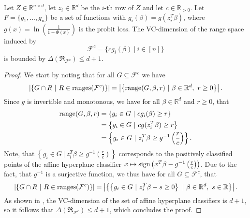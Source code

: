 \begin{lemma}
    \label{lemma:vcdim-constant}
    Let $Z \in \mathbb{R}^{n \times d}$, let $z_i \in \mathbb{R}^d$ be the
    $i$-th row of $Z$ and let $c \in \mathbb{R}_{>0}$.
    Let $F = \{g_1, ..., g_n\}$ be a set of functions with
    $g_i(\beta) = g(z_i^T \beta)$, where
    $g(x) = \ln\left(\frac{1}{1 - \Phi(x)}\right)$ is the
    probit loss.
    The VC-dimension of the range space induced by
    \begin{equation*}
        \mathcal{F}^c = \{ c g_i(\beta) \ | \ i \in [n] \}
    \end{equation*}
    is bounded by $\Delta(\mathfrak{R}_{\mathcal{F}^c}) \leq d + 1$.
\end{lemma}
\begin{proof}
    We start by noting that for all $G \subseteq \mathcal{F}^c$ we have
    \begin{equation*}
        \left| \left\{ G \cap R \ | \
        R \in \textup{ranges}(\mathcal{F}^c) \right\} \right|
        =
        \left| \left\{ \textup{range}(G, \beta, r) \ | \
        \beta \in \mathbb{R}^d, \ r \geq 0 \right\} \right|.
    \end{equation*}
    Since $g$ is invertible and monotonous, we have for all
    $\beta \in \mathbb{R}^d$ and $r \geq 0$, that
    \begin{align*}
        \textup{range}(G, \beta, r)
         & = \left\{ g_i \in G \ |\ c g_i(\beta) \geq r \right\}                                 \\
         & = \left\{ g_i \in G \ |\ c g(z_i^T \beta) \geq r \right\}                             \\
         & = \left\{ g_i \in G \ |\ z_i^T \beta \geq g^{-1} \left( \frac{r}{c} \right) \right\}.
    \end{align*}
    Note, that $\left\{ g_i \in G
        \ |\ z_i^T \beta \geq g^{-1} \left( \frac{r}{c} \right) \right\}$
    corresponds to the positively classified points of the
    affine hyperplane classifier
    $x \mapsto \textup{sign}\left(
        x^T\beta - g^{-1}\left(\frac{r}{c}\right) \right)$.
    Due to the fact, that $g^{-1}$ is a surjective function,
    we thus have for all $G \subseteq \mathcal{F}^c$, that
    \begin{equation*}
        \left| \left\{ G \cap R \ | \
        R \in \textup{ranges}(\mathcal{F}^c) \right\} \right|
        =
        \left| \left\{ \left\{ g_i \in G
        \ |\ z_i^T \beta - s \geq 0 \right\} \ | \
        \beta \in \mathbb{R}^d, \ s \in \mathbb{R} \right\} \right|.
    \end{equation*}
    As shown in \cite{computational-learning-theory}, the VC-dimension
    of the set of affine hyperplane classifiers is
    $d+1$, so it follows that
    $\Delta(\mathfrak{R}_{\mathcal{F}^c}) \leq d + 1$,
    which concludes the proof.
\end{proof}

